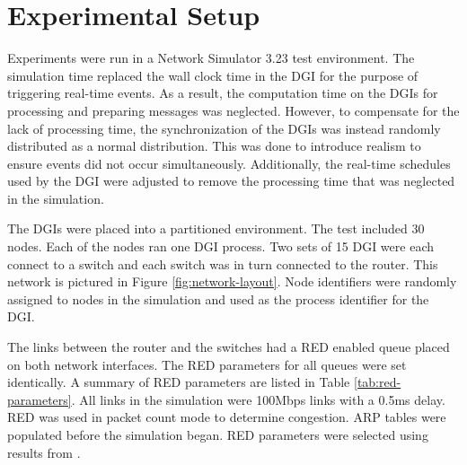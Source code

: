 
\section{Experimental Setup}
\label{sect:experimentalsetup}

Experiments were run in a Network Simulator 3.23\cite{NS3} test environment.
The simulation time replaced the wall clock time in the \ac{DGI} for the purpose of triggering real-time events.
As a result, the computation time on the \ac{DGI}s for processing and preparing messages was neglected.
However, to compensate for the lack of processing time, the synchronization of the \ac{DGI}s was instead randomly distributed as a normal distribution.
This was done to introduce realism to ensure events did not occur simultaneously.
Additionally, the real-time schedules used by the \ac{DGI} were adjusted to remove the processing time that was neglected in the simulation.

The \ac{DGI}s were placed into a partitioned environment.
The test included 30 nodes.
Each of the nodes ran one \ac{DGI} process.
Two sets of 15 \ac{DGI} were each connect to a switch and each switch was in turn connected to the router.
This network is pictured in Figure \ref{fig:network-layout}.
Node identifiers were randomly assigned to nodes in the simulation and used as the process identifier for the \ac{DGI}.

The links between the router and the switches had a \ac{RED} enabled queue placed on both network interfaces.
The \ac{RED} parameters for all queues were set identically.
A summary of \ac{RED} parameters are listed in Table \ref{tab:red-parameters}.
All links in the simulation were 100Mbps links with a 0.5ms delay.
RED was used in packet count mode to determine congestion.
ARP tables were populated before the simulation began.
\ac{RED} parameters were selected using results from \cite{JOURNAL}.

